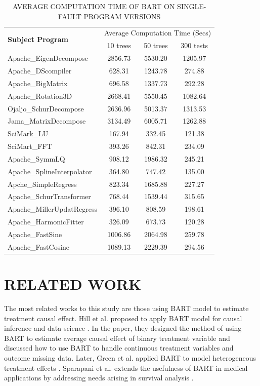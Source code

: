 \begin{table}[htbp!]
\caption{AVERAGE COMPUTATION TIME OF BART ON SINGLE-FAULT PROGRAM VERSIONS }
\label{BARTcomputetime}
\centering
      \begin{tabular}{|l|c|c|c|}
      \hline
\multirow{2}{*}{{\bf Subject Program}}	&	\multicolumn{3}{|c|}{Average Computation Time (Secs)}	\\	\cline{2-4}
& 10 trees & 50 trees & 300 tests\\ \hline

Apache\_EigenDecompose	&	2856.73	&	5530.20	&	1205.97	\\ \hline
Apache\_DScompiler	&	628.31	&	1243.78	&	274.88	\\ \hline
Apache\_BigMatrix	&	696.58	&	1337.73	&	292.28	\\ \hline
Apache\_Rotation3D	&	2668.41	&	5550.45	&	1082.64	\\ \hline
Ojaljo\_SchurDecompose	&	2636.96	&	5013.37	&	1313.53	\\ \hline
Jama\_MatrixDecompose	&	3134.49	&	6005.71	&	1262.88	\\ \hline
SciMark\_LU	&	167.94	&	332.45	&	121.38	\\ \hline
SciMart\_FFT	&	393.26	&	842.31	&	234.09	\\ \hline
Apache\_SymmLQ	&	908.12	&	1986.32	&	245.21	\\ \hline
Apache\_SplineInterpolator	&	364.80	&	747.42	&	135.00	\\ \hline
Apche\_SimpleRegress	&	823.34	&	1685.88	&	227.27	\\ \hline
Apache\_SchurTransformer	&	768.44	&	1539.44	&	315.65	\\ \hline
Apache\_MillerUpdatRegress	&	396.10	&	808.59	&	198.61	\\ \hline
Apache\_HarmonicFitter	&	326.09	&	673.73	&	120.28	\\ \hline
Apache\_FastSine	&	1006.86	&	2064.98	&	259.78	\\ \hline
Apache\_FastCosine	&	1089.13	&	2229.39	&	294.56	\\ \hline
\end{tabular}
\end{table}

\section{RELATED WORK}\label{BARTrelatedwork}
The most related works to this study are those using BART model to estimate treatment causal effect. Hill et al. proposed to apply BART model for causal inference and data science \cite{hill2012bayesian, hill2013assessing}. In the paper, they designed the method of using BART to estimate average causal effect of binary treatment variable and discussed how to use BART to handle continuous treatment variables and outcome missing data. Later, Green et al. applied BART to model heterogeneous treatment effects \cite{green2012modeling}. Sparapani et al. extends the usefulness of BART in medical applications by addressing needs arising in survival analysis \cite{sparapani2016nonparametric}.

